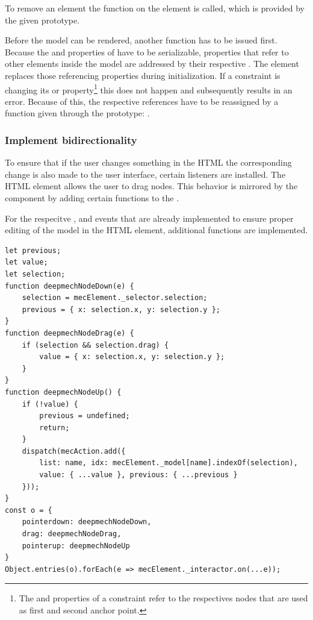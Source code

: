 To remove an element the  function on the element is called, which is provided by the given prototype.

Before the model can be rendered, another function has to be issued first.
Because the  and  properties of  have to be serializable, properties that refer to other elements inside the model are addressed by their respective .
The element replaces those referencing properties during initialization.
If a constraint is changing its  or  property\footnote{The  and  properties of a constraint refer to the respectives nodes that are used as first and second anchor point.} this does not happen and subsequently results in an error.
Because of this, the respective references have to be reassigned by a function given through the prototype: .

\subsubsection{Implement bidirectionality}

To ensure that if the user changes something in the  HTML the corresponding change is also made to the user interface, certain listeners are installed.
The  HTML element allows the user to drag nodes.
This behavior is mirrored by the  component by adding certain functions to the .

For the respecitve ,  and  events that are already implemented to ensure proper editing of the model in the  HTML element, additional functions are implemented.

\begin{lstlisting}[label={lst:bidirectional_node_update}, caption={Adding functions to \code{mecElement.\_interactor} to work bidirectional.}]
let previous;
let value;
let selection;
function deepmechNodeDown(e) {
    selection = mecElement._selector.selection;
    previous = { x: selection.x, y: selection.y };
}
function deepmechNodeDrag(e) {
    if (selection && selection.drag) {
        value = { x: selection.x, y: selection.y };
    }
}
function deepmechNodeUp() {
    if (!value) {
        previous = undefined;
        return;
    }
    dispatch(mecAction.add({
        list: name, idx: mecElement._model[name].indexOf(selection),
        value: { ...value }, previous: { ...previous }
    }));
}
const o = {
    pointerdown: deepmechNodeDown,
    drag: deepmechNodeDrag,
    pointerup: deepmechNodeUp
}
Object.entries(o).forEach(e => mecElement._interactor.on(...e));
\end{lstlisting}

